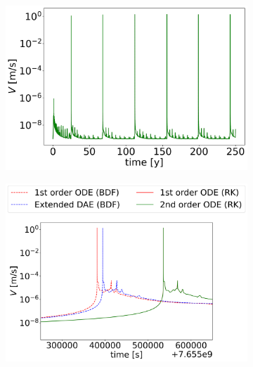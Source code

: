 \begin{figure}[H]
	\centering
	\begin{subfigure}[b]{0.32\textwidth}
		\centering 
		\includegraphics[width=1\textwidth]{images/TANDEMtimeEvolution_3D_maxSlipRate_allFormulations.png}
	\end{subfigure} 
	\begin{subfigure}[b]{0.32\textwidth}
		\centering
		\includegraphics[width=1.18\textwidth]{images/TANDEMtimeEvolution_3D_maxSlipRate_allFormulations_LastEarthquake.png}
	\end{subfigure}
	\begin{subfigure}[b]{0.32\textwidth}

\end{subfigure}
\end{figure}
